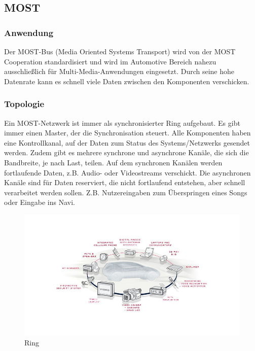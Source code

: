    \subsection{MOST}		
    \subsubsection{Anwendung}
    Der MOST-Bus (Media Oriented Systems Transport) wird von der MOST Cooperation standardisiert und wird im Automotive Bereich nahezu ausschließlich für Multi-Media-Anwendungen eingesetzt. Durch seine hohe Datenrate kann es schnell viele Daten zwischen den Komponenten verschicken. 
    \cite{.MH_Vehicle}
    
    \subsubsection{Topologie}
    Ein MOST-Netzwerk ist immer als synchronisierter Ring aufgebaut. Es gibt immer einen Master, der die Synchronisation steuert. Alle Komponenten haben eine Kontrollkanal, auf der Daten zum Status des Systems/Netzwerks gesendet werden. Zudem gibt es mehrere synchrone und asynchrone Kanäle, die sich die Bandbreite, je nach Last, teilen.
    Auf dem synchronen Kanälen werden fortlaufende Daten, z.B. Audio- oder Videostreams verschickt.
    Die asynchronen Kanäle sind für Daten reserviert, die nicht fortlaufend entstehen, aber schnell verarbeitet werden sollen. Z.B. Nutzereingaben zum Überspringen eines Songs oder Eingabe ins Navi. \cite{BP01}
    
    \begin{figure}[h!]
        \includegraphics[width=\linewidth]{most_ring.jpg}
        \caption[images.tecchannel.de/bdb/361603/840x473.jpg]{Ring}
    \end{figure}
    
